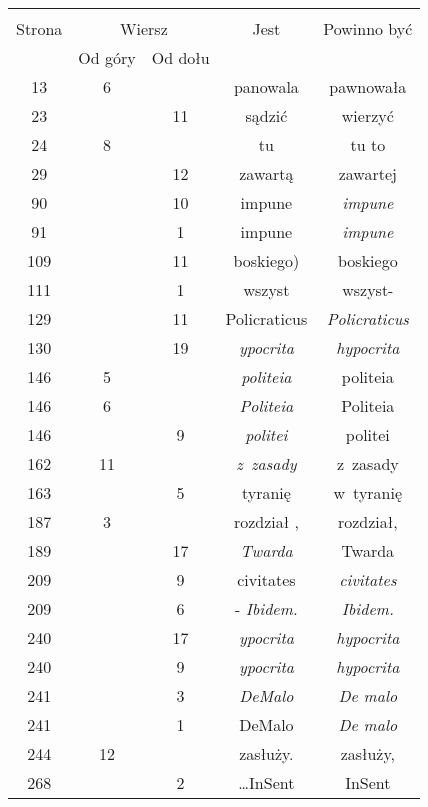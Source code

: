 \documentclass[a4paper,11pt]{article}
\begin{document}
\begin{center}

  \begin{tabular}{|c|c|c|c|c|}
    \hline
    & \multicolumn{2}{c|}{} & & \\
    Strona & \multicolumn{2}{c|}{Wiersz} & Jest
                              & Powinno być \\ \cline{2-3}
    & Od góry & Od dołu & & \\
    \hline
    13  &  6 & & panowala & pawnowała \\
    23  & & 11 & sądzić & wierzyć \\
    24  &  8 & & tu & tu to \\
    29  & & 12 & zawartą & zawartej \\
    90  & & 10 & impune & \textit{impune} \\
    91  & &  1 & impune & \textit{impune} \\
    109 & & 11 & boskiego) & boskiego \\
    111 & &  1 & wszyst & wszyst- \\
    129 & & 11 & Policraticus & \textit{Policraticus} \\
    130 & & 19 & \textit{ypocrita} & \textit{hypocrita} \\
    146 &  5 & & \textit{politeia} & politeia \\
    146 &  6 & & \textit{Politeia}& Politeia \\
    146 & &  9 & \textit{politei} & politei \\
    162 & 11 & & \textit{z~zasady} & z~zasady \\
    163 & &  5 & tyranię & w~tyranię \\
    187 &  3 & & rozdział , & rozdział, \\
    189 & & 17 & \textit{Twarda} & Twarda \\
    209 & &  9 & civitates & \textit{civitates} \\
    209 & &  6 & - \textit{Ibidem.} & \textit{Ibidem.} \\
    240 & & 17 & \textit{ypocrita} & \textit{hypocrita} \\
    240 & &  9 & \textit{ypocrita} & \textit{hypocrita} \\
    241 & &  3 & \textit{DeMalo} & \textit{De malo} \\
    241 & &  1 & DeMalo & \textit{De malo} \\
    244 & 12 & & zasłuży. & zasłuży, \\
    268 & &  2 & \ldots InSent & InSent \\

\end{tabular}
\end{center}
\end{document}
